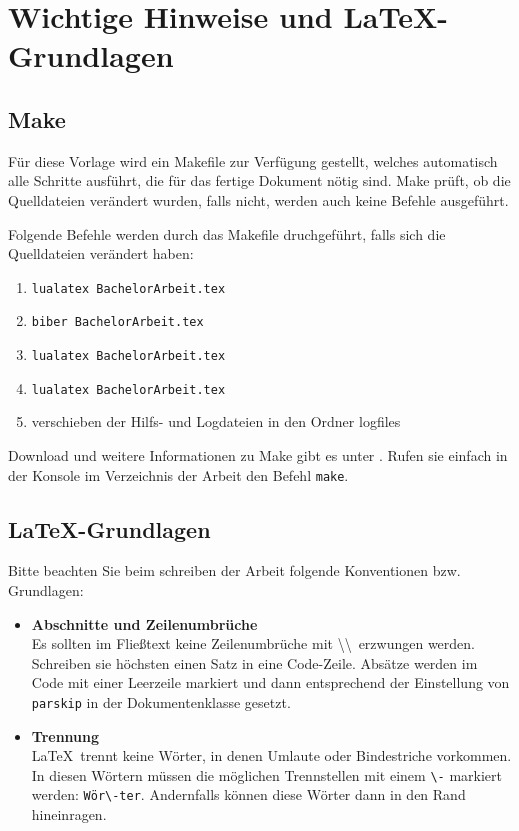 \chapter{Wichtige Hinweise und \LaTeX-Grundlagen}

\section{Make}\label{make}

Für diese Vorlage wird ein Makefile zur Verfügung gestellt, welches automatisch alle Schritte ausführt, die für das fertige Dokument nötig sind. Make prüft, ob die Quelldateien verändert wurden, falls nicht, werden auch keine Befehle ausgeführt.

Folgende Befehle werden durch das Makefile druchgeführt, falls sich die Quelldateien verändert haben:

\begin{enumerate}
    \item \texttt{lualatex BachelorArbeit.tex}
    \item \texttt{biber BachelorArbeit.tex}
    \item \texttt{lualatex BachelorArbeit.tex}
    \item \texttt{lualatex BachelorArbeit.tex}
    \item verschieben der Hilfs- und Logdateien in den Ordner logfiles
\end{enumerate}

Download und weitere Informationen zu Make gibt es unter \cite{make}.
Rufen sie einfach in der Konsole im Verzeichnis der Arbeit den Befehl \texttt{make}.

\section{\LaTeX-Grundlagen}

Bitte beachten Sie beim schreiben der Arbeit folgende Konventionen bzw. Grundlagen:

\begin{itemize}
    \item \textbf{Abschnitte und Zeilenumbrüche} \\
        Es sollten im Fließtext keine Zeilenumbrüche mit \textbackslash\textbackslash \ erzwungen werden.
        Schreiben sie höchsten einen Satz in eine Code-Zeile.
        Absätze werden im Code mit einer Leerzeile markiert und dann entsprechend der Einstellung von \texttt{parskip} in der Dokumentenklasse gesetzt.
    \item \textbf{Trennung} \\
        \LaTeX \ trennt keine Wörter, in denen Umlaute oder Bindestriche vorkommen. 
        In diesen Wörtern müs\-sen die mög\-lichen Trennstellen mit einem \texttt{\textbackslash -} markiert werden: \texttt{Wör\textbackslash-ter}.
        Andernfalls können diese Wörter dann in den Rand hineinragen.


\end{itemize}

